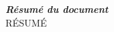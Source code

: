 \thispagestyle{empty}
\vspace*{10mm}

\textbf{\emph{\textcolor{onitu}{\large{Résumé du document} } } }\\

RÉSUMÉ

\clearpage
